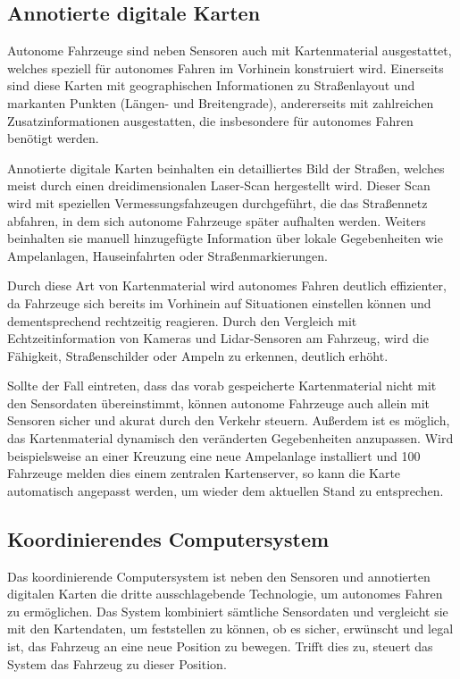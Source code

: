\subsection{Annotierte digitale Karten}\label{maps}

Autonome Fahrzeuge sind neben Sensoren auch mit Kartenmaterial ausgestattet, welches speziell für autonomes Fahren im Vorhinein konstruiert wird. Einerseits sind diese Karten mit geographischen Informationen zu Straßenlayout und markanten Punkten (Längen- und Breitengrade), andererseits mit zahlreichen Zusatzinformationen ausgestatten, die insbesondere für autonomes Fahren benötigt werden. 

Annotierte digitale Karten beinhalten ein detailliertes Bild der Straßen, welches meist durch einen dreidimensionalen Laser-Scan hergestellt wird. Dieser Scan wird mit speziellen Vermessungsfahzeugen durchgeführt, die das Straßennetz abfahren, in dem sich autonome Fahrzeuge später aufhalten werden.
Weiters beinhalten sie manuell hinzugefügte Information über lokale Gegebenheiten wie Ampelanlagen, Hauseinfahrten oder Straßenmarkierungen. 

Durch diese Art von Kartenmaterial wird autonomes Fahren deutlich effizienter, da Fahrzeuge sich bereits im Vorhinein auf Situationen einstellen können und dementsprechend rechtzeitig reagieren. Durch den Vergleich mit Echtzeitinformation von Kameras und \acs{Lidar}-Sensoren am Fahrzeug, wird die Fähigkeit, Straßenschilder oder Ampeln zu erkennen, deutlich erhöht. 

Sollte der Fall eintreten, dass das vorab gespeicherte Kartenmaterial nicht mit den Sensordaten übereinstimmt, können autonome Fahrzeuge auch allein mit Sensoren sicher und akurat durch den Verkehr steuern. Außerdem ist es möglich, das Kartenmaterial dynamisch den veränderten Gegebenheiten anzupassen. Wird beispielsweise an einer Kreuzung eine neue Ampelanlage installiert und 100 Fahrzeuge melden dies einem zentralen Kartenserver, so kann die Karte automatisch angepasst werden, um wieder dem aktuellen Stand zu entsprechen. 

\subsection{Koordinierendes Computersystem}

Das koordinierende Computersystem ist neben den Sensoren und annotierten digitalen Karten die dritte ausschlagebende Technologie, um autonomes Fahren zu ermöglichen. Das System kombiniert sämtliche Sensordaten und vergleicht sie mit den Kartendaten, um feststellen zu können, ob es sicher, erwünscht und legal ist, das Fahrzeug an eine neue Position zu bewegen. Trifft dies zu, steuert das System das Fahrzeug zu dieser Position.


